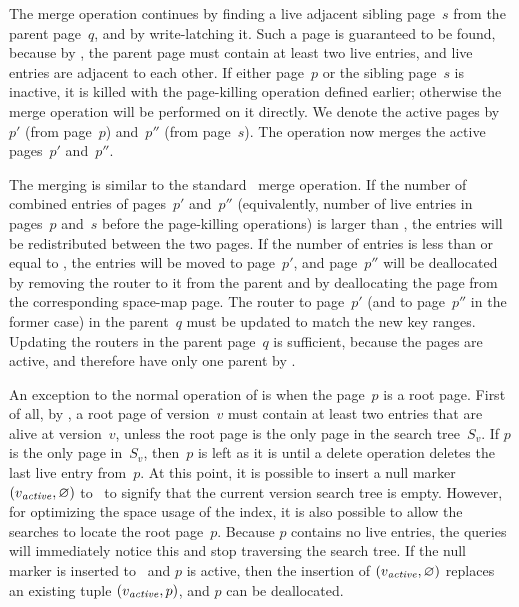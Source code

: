The merge operation continues by finding a live adjacent sibling page~$s$
from the parent page~$q$, and by write-latching it. 
Such a page is guaranteed to be found, because by
, the parent page must contain at least two live
entries, and live entries are adjacent to each other.
If either page~$p$ or the sibling page~$s$ is inactive, it
is killed with the page-killing operation defined earlier; otherwise the
merge operation will be performed on it directly. 
We denote the active pages by~$p'$ (from page~$p$) and~$p''$ (from
page~$s$).
The operation now merges the active pages~$p'$ and~$p''$.

The merging is similar to the standard \Btree\ merge operation. 
If the number of combined entries of pages~$p'$ and~$p''$ (equivalently,
number of live entries in pages~$p$ and~$s$ before the page-killing
operations) is larger than \maxsplit, the entries will be redistributed
between the two pages. 
If the number of entries is less than or equal to \maxsplit, the entries
will be moved to page~$p'$, and page~$p''$ will be deallocated by
removing the router to it from the parent and by deallocating the page
from the corresponding space-map page.
The router to page~$p'$ (and to page~$p''$ in the former case) in the
parent~$q$ must be updated to match the new key ranges. 
Updating the routers in the parent page~$q$ is sufficient, because the pages
are active, and therefore have only one parent by
.

An exception to the normal operation of  is when
the page~$p$ is a root page.
First of all, by , a root page of version~$v$
must contain at least two entries that are alive at version~$v$, unless the
root page is the only page in the search tree~$S_v$. 
If $p$ is the only page in~$S_v$, then~$p$ is left as it is until a delete
operation deletes the last live entry from~$p$.  
At this point, it is possible to insert a null marker $(\smash{v_{\text{\textit{active}}}},\varnothing)$
to \rootstar\ to signify that the current version search tree is empty.
However, for optimizing the space usage of the index, it is also possible to
allow the searches to locate the root page~$p$. 
Because $p$ contains no live entries, the queries will immediately notice
this and stop traversing the search tree.
If the null marker is inserted to \rootstar\ and $p$ is active, then the
insertion of $(\smash{v_{\text{\textit{active}}}}, \varnothing)$ replaces an existing tuple $(\smash{v_{\text{\textit{active}}}},
p)$, and $p$ can be deallocated. 

